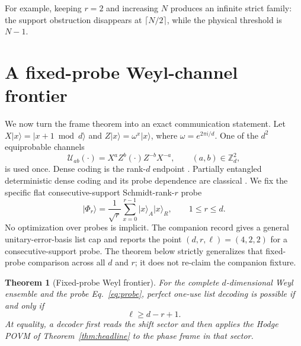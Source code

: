 \documentclass[11pt,a4paper]{article}
\newtheorem{theorem}{Theorem}[section]
\newcommand{\ket}[1]{\lvert #1\rangle}
\begin{document}
For example, keeping $r=2$ and increasing $N$ produces an infinite strict
family: the support obstruction disappears at $\lceil N/2\rceil$, while the
physical threshold is $N-1$.

\section{A fixed-probe Weyl-channel frontier}\label{sec:weyl}

We now turn the frame theorem into an exact communication statement.  Let
$X\ket{x}=\ket{x+1\bmod d}$ and $Z\ket{x}=\omega^x\ket{x}$, where
$\omega=e^{2\pi i/d}$.  One of the $d^2$ equiprobable channels
\[
  \mathcal U_{ab}(\cdot)=X^aZ^b(\cdot)Z^{-b}X^{-a},
  \qquad (a,b)\in\mathbb Z_d^2,
\]
is used once.  Dense coding is the rank-$d$ endpoint
\cite{BennettWiesner1992}.  Partially entangled deterministic dense coding and
its probe dependence are classical
\cite{MozesOppenheimReznik2005,WuCohenSunGriffiths2006}.  We fix the specific
flat consecutive-support Schmidt-rank-$r$ probe
\begin{equation}\label{eq:probe}
  \ket{\Phi_r}=\frac1{\sqrt r}\sum_{x=0}^{r-1}\ket{x}_A\ket{x}_R,
  \qquad 1\le r\le d.
\end{equation}
No optimization over probes is implicit.
The companion record \cite{ErikssonMatroidUnion2026} gives a general
unitary-error-basis list cap and reports the point $(d,r,\ell)=(4,2,2)$ for a
consecutive-support probe.  The theorem below strictly generalizes that
fixed-probe comparison across all $d$ and $r$; it does not re-claim the
companion fixture.

\begin{theorem}[Fixed-probe Weyl frontier]\label{thm:weyl}
For the complete $d$-dimensional Weyl ensemble and the probe
Eq.~\eqref{eq:probe}, perfect one-use list decoding is possible if and only if
\begin{equation}\label{eq:weylthreshold}
  \ell\ge d-r+1.
\end{equation}
At equality, a decoder first reads the shift sector and then applies the Hodge
POVM of Theorem~\ref{thm:headline} to the phase frame in that sector.
\end{theorem}
\end{document}
